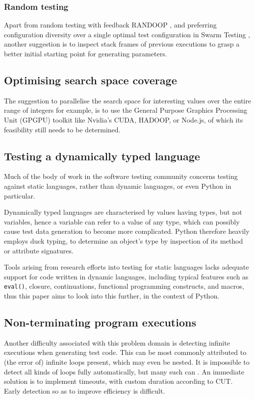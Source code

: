 \documentclass{icldt}
\numberwithin{equation}{section}       %
\begin{document}
\subsubsection{Random testing}
Apart from random testing with feedback RANDOOP \cite{Pacheco2007}, and preferring configuration diversity over a single optimal test configuration in Swarm Testing \cite{AlexGroceSep2011}, another suggestion is to inspect stack frames of previous executions to grasp a better initial starting point for generating parameters.
\subsection{Optimising search space coverage}
The suggestion to parallelise the search space for interesting values over the entire range of integers for example, is to use the General Purpose Graphics Processing Unit (GPGPU) toolkit like Nvidia's CUDA, HADOOP, or Node.js, of which its feasibility still needs to be determined.
\subsection{Testing a dynamically typed language}
Much of the body of work in the software testing community concerns testing against static languages, rather than dynamic languages, or even Python in particular.

Dynamically typed languages are characterised by values having types, but not variables, hence a variable can refer to a value of any type, which can possibly cause test data generation to become more complicated. Python therefore heavily employs duck typing, to determine an object's type by inspection of its method or attribute signatures.

Tools arising from research efforts into testing for static languages lacks adequate support for code written in dynamic languages, including typical features such as \texttt{eval()}, closure, continuations, functional programming constructs, and macros, thus this paper aims to look into this further, in the context of Python.
\subsection{Non-terminating program executions}
Another difficulty associated with this problem domain is detecting infinite executions when generating test code. This can be most commonly attributed to (the error of) infinite loops present, which may even be nested. It is impossible to detect all kinds of loops fully automatically, but many such can \cite{Tahbildar}. An immediate solution is to implement timeouts, with custom duration according to CUT. Early detection so as to improve efficiency is difficult.
\end{document}
